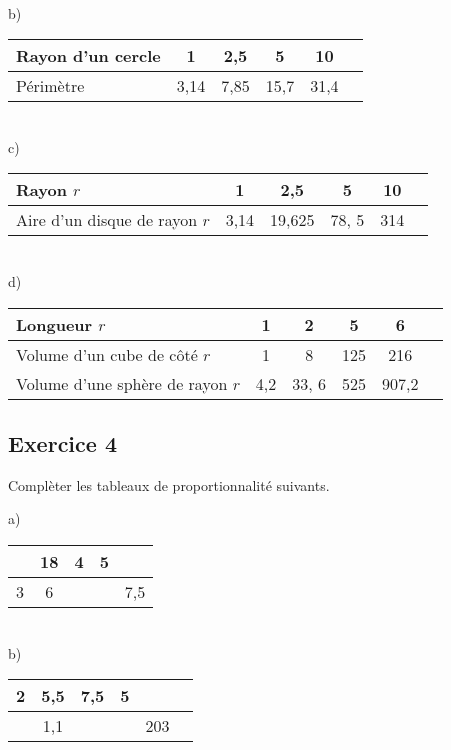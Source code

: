 \documentclass[12 pt]{extarticle}
\theoremstyle{plain}
\begin{document}
 \ \\ 
 
b) \begin{tabular}{|l | c | c | c | c | c}
\hline
Rayon d'un cercle & 1 & 2,5 &  5 & 10 \\
\hline
Périmètre & 3,14 &7,85 & 15,7& 31,4\\ \hline

\end{tabular}

 \ \\ 
 
 
c) \begin{tabular}{|l | c | c | c | c | c}
\hline
Rayon $r$ & 1 & 2,5 &  5 & 10 \\
\hline
Aire d'un disque de rayon $r$ & 3,14 & 19,625 & 78, 5& 314\\ \hline

\end{tabular}

 \ \\ 
 
d) \begin{tabular}{|l | c | c | c | c | c}
\hline
Longueur $r$ & 1 & 2 &  5 & 6 \\
\hline
Volume d'un cube de côté $r$ & 1 & 8 & 125 & 216 \\ \hline
Volume d'une sphère de rayon $r$ & 4,2 & 33, 6 & 525& 907,2\\ \hline

\end{tabular}
 
 
 \subsection*{Exercice 4}

Complèter les tableaux de proportionnalité suivants. 

a) \begin{tabular}{ | c |c | c| c|c| }\hline
 & 18  & 4 & 5 & \\
 \hline
 3 & 6 &  &  & 7,5 \\ \hline
\end{tabular} 

 \ \\ 
 
b) \begin{tabular}{|c | c | c | c | c | c}
\hline
2 & 5,5  & 7,5 &  5 &  \\
\hline
 & 1,1 & & &203 \\ \hline

\end{tabular}
\end{document}
